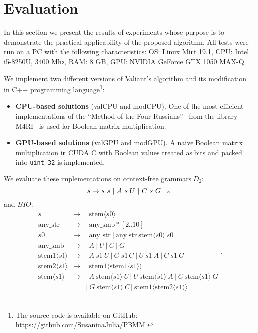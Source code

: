 \section{Evaluation}

In this section we present the results of experiments whose purpose is to demonstrate the practical applicability of the proposed algorithm. All tests were run on a PC with the following characteristics: OS: Linux Mint 19.1, CPU: Intel i5-8250U, 3400 Mhz, RAM: 8 GB, GPU: NVIDIA GeForce GTX 1050 MAX-Q.

We implement two different versions of Valiant's algorithm and its modification in C++ programming language\footnote{The source code is available on GitHub: \url{https://github.com/SusaninaJulia/PBMM}.}:

\begin{itemize}
    \item \textbf{CPU-based solutions} (\textsf{valCPU} and \textsf{modCPU}).
    One of the most efficient implementations of the “Method of the Four Russians”~\cite{arlazarov1970economical} from the library M4RI~\cite{Albrecht_2010} is used for Boolean matrix multiplication. 
    \item \textbf{GPU-based solutions} (\textsf{valGPU} and \textsf{modGPU}).
    A naive Boolean matrix multiplication in CUDA C with Boolean values treated as bits and packed into \texttt{uint\_32} is implemented.
\end{itemize}


We evaluate these implementations on context-free grammars $D_2$: 
$$
s  \rightarrow  s \ s \ | \ A \ s \ U \ | \ C \ s \ G \ | \ \varepsilon \\
$$ and $BIO$: \[
    \begin{array}{rcl}
            s & \rightarrow & \ \ \text{stem}\langle s0 \rangle \\
            \text{any\_str} & \rightarrow & \ \ \text{any\_smb}*[2..10] \\
            s0 & \rightarrow & \ \ \text{any\_str} \ | \ \text{any\_str} \ \text{stem}\langle s0 \rangle \ s0 \\
            \text{any\_smb} & \rightarrow &  \ \ A \ | \ U \ | \ C \ | \  G \\
            \text{stem1}\langle s1 \rangle & \rightarrow & \ \ A \ s1 \  U \ | \ G \ s1 \ C \ | \ U \ s1 \ A \ | \ C \ s1 \ G \\
            \text{stem2}\langle s1 \rangle & \rightarrow & \ \ \text{stem1}\langle \text{stem1}\langle s1 \rangle \rangle \\
            \text{stem}\langle s1 \rangle & \rightarrow & \ \ A \ \text{stem}\langle s1 \rangle \ U
              \ | \ U \ \text{stem}\langle s1 \rangle \ A \ | \ C \ \text{stem}\langle s1 \rangle \ G \\
              & & | \ G \ \text{stem}\langle s1 \rangle \ C 
              \  | \ \text{stem1}\langle \text{stem2}\langle s1 \rangle \rangle \\
    \end{array}.
    \]


